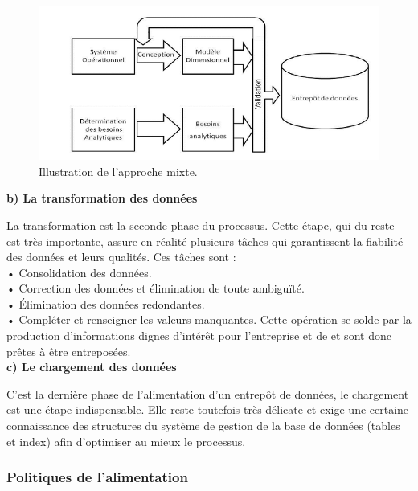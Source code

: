 \begin{figure}[h]
	\begin{center}
		\includegraphics[scale=0.85]{images/mixte.png}
		\caption{Illustration de l’approche mixte.}
		\label{synthese-cout-salarie}
	\end{center}
\end{figure}

\textbf{b) La transformation des données}

La transformation est la seconde phase du processus. Cette étape, qui du reste est très importante, assure en réalité plusieurs tâches qui garantissent la fiabilité des données et leurs qualités. Ces tâches sont :\\
•	Consolidation des données.\\
•	Correction des données et élimination de toute ambiguïté.\\
•	Élimination des données redondantes.\\
•	Compléter et renseigner les valeurs manquantes. Cette opération se solde par la production d’informations dignes d’intérêt pour l’entreprise et de et sont donc prêtes à être entreposées.\\

\textbf{c) Le chargement des données}

C’est la dernière phase de l’alimentation d’un entrepôt de données, le chargement est une étape indispensable. Elle reste toutefois très délicate et exige une certaine connaissance des structures du système de gestion de la base de données (tables et index) afin d’optimiser au mieux le processus.

\subsubsection{Politiques de l’alimentation}
